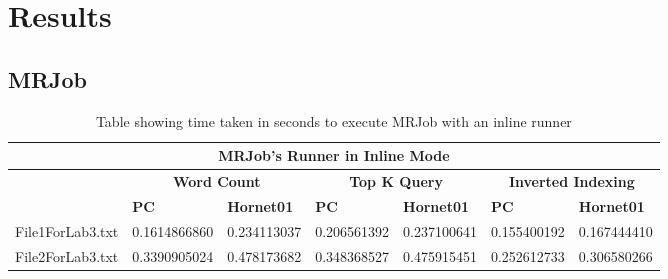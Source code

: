 \documentclass[10pt, twocolumn]{article}
\begin{document}
\section{Results}
\label{app:Results}
\subsection{MRJob}
\begin{table}[H]
\centering
\caption{Table showing time taken in seconds to execute MRJob with an inline runner}
\label{tbl:MRJobInlineRunnerResults}
\begin{tabular}{|l|l|l|l|l|l|l|}
\hline
\multicolumn{7}{|c|}{\textbf{MRJob's Runner in Inline Mode}}                                                                                                                                                \\ \hline
\textbf{}                         & \multicolumn{2}{c|}{\textbf{Word Count}}                                  & \multicolumn{2}{c|}{\textbf{Top K Query}} & \multicolumn{2}{c|}{\textbf{Inverted Indexing}} \\ \hline
 & \multicolumn{1}{l|}{\textbf{PC}} & \multicolumn{1}{l|}{\textbf{Hornet01}} & \textbf{PC}      & \textbf{Hornet01}      & \textbf{PC}         & \textbf{Hornet01}         \\ \cline{1-7} 
File1ForLab3.txt                                  & 0.1614866860                     & 0.234113037                            & 0.206561392      & 0.237100641            & 0.155400192         & 0.167444410               \\ \hline
File2ForLab3.txt                  & 0.3390905024                     & 0.478173682                            & 0.348368527      & 0.475915451            & 0.252612733         & 0.306580266               \\ \hline
\end{tabular}
\end{table}
\end{document}

